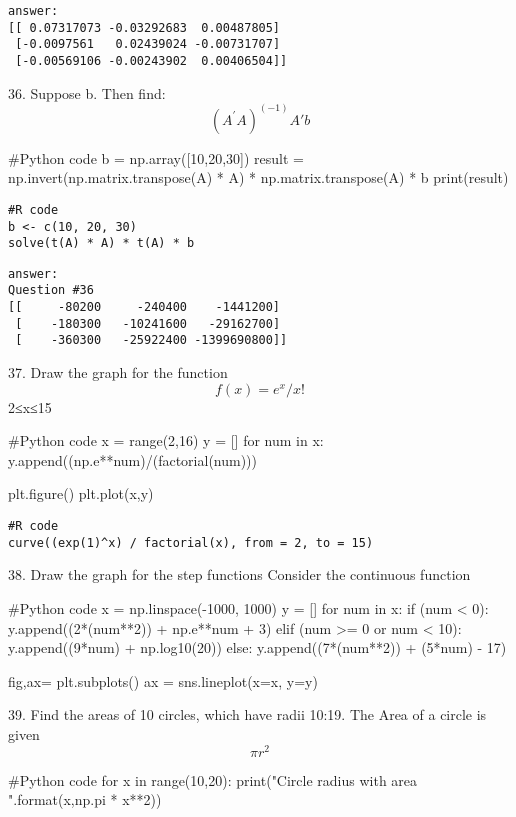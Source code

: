 \documentclass{article}
\begin{document}
\begin{verbatim}
answer: 
[[ 0.07317073 -0.03292683  0.00487805]
 [-0.0097561   0.02439024 -0.00731707]
 [-0.00569106 -0.00243902  0.00406504]]
\end{verbatim}


36. Suppose b. Then find: \[(A^' A)^(-1) A'b\]
\begin{pythoncode}
#Python code
b = np.array([10,20,30])
result = np.invert(np.matrix.transpose(A) * A) * np.matrix.transpose(A) * b
print(result)
\end{pythoncode}

\begin{verbatim}
#R code
b <- c(10, 20, 30)
solve(t(A) * A) * t(A) * b
\end{verbatim}

\begin{verbatim}
answer: 
Question #36
[[     -80200     -240400    -1441200]
 [    -180300   -10241600   -29162700]
 [    -360300   -25922400 -1399690800]]
\end{verbatim}


37. Draw the graph for the function \[f(x)=e^x/x!\]2≤x≤15
\begin{pythoncode}
#Python code
x = range(2,16)
y = []
for num in x:
    y.append((np.e**num)/(factorial(num)))

plt.figure()
plt.plot(x,y)
\end{pythoncode}

\begin{verbatim}
#R code
curve((exp(1)^x) / factorial(x), from = 2, to = 15)
\end{verbatim}


38.	Draw the graph for the step functions Consider the continuous function
\begin{pythoncode}
#Python code
x = np.linspace(-1000, 1000)
y = []
for num in x:
    if (num < 0):
        y.append((2*(num**2)) + np.e**num + 3)
    elif (num >= 0 or num < 10):
        y.append((9*num) + np.log10(20))
    else:
        y.append((7*(num**2)) + (5*num) - 17)

fig,ax= plt.subplots()
ax = sns.lineplot(x=x, y=y)
\end{pythoncode}


39. Find the areas of 10 circles, which have radii 10:19. The Area of a circle is given \[πr^2\]
\begin{pythoncode}
#Python code
for x in range(10,20):
    print("Circle radius {} with area {}".format(x,np.pi * x**2))
\end{pythoncode}
\end{document}
